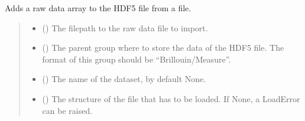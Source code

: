 \documentclass[letterpaper,10pt,english]{sphinxmanual}
\begin{document}
\begin{fulllineitems}
\begin{fulllineitems}
\end{fulllineitems}


\begin{fulllineitems}
\label{\detokenize{source/_autosummary/HDF5_BLS.Wrapper:HDF5_BLS.Wrapper.import_raw_data}}
\pysigstartsignatures
\pysiglinewithargsret
{}
{\sphinxparamcomma {}\sphinxparamcomma {}\sphinxparamcomma {}\sphinxparamcomma {}\sphinxparamcomma {}\sphinxparamcomma {}}
{}
\pysigstopsignatures
\sphinxAtStartPar
Adds a raw data array to the HDF5 file from a file.
\begin{quote}\begin{description}
\begin{itemize}
\item {} 
\sphinxAtStartPar
{} () \textendash{} The filepath to the raw data file to import.

\item {} 
\sphinxAtStartPar
{} (\sphinxstyleliteralemphasis{\sphinxupquote{, }}) \textendash{} The parent group where to store the data of the HDF5 file. The format of this group should be “Brillouin/Measure”.

\item {} 
\sphinxAtStartPar
{} (\sphinxstyleliteralemphasis{\sphinxupquote{, }}) \textendash{} The name of the dataset, by default None.

\item {} 
\sphinxAtStartPar
{} (\sphinxstyleliteralemphasis{\sphinxupquote{, }}) \textendash{} The structure of the file that has to be loaded. If None, a LoadError can be raised.


\end{itemize}
\end{description}
\end{quote}
\end{fulllineitems}
\end{fulllineitems}
\end{document}
